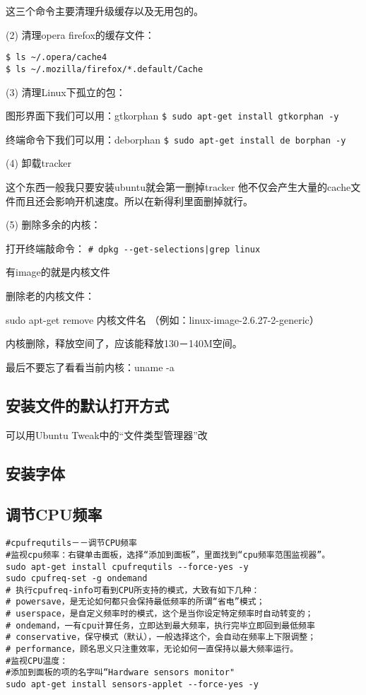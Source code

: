 这三个命令主要清理升级缓存以及无用包的。

(2) 清理opera firefox的缓存文件：
\begin{verbatim}
$ ls ~/.opera/cache4
$ ls ~/.mozilla/firefox/*.default/Cache
\end{verbatim}

(3) 清理Linux下孤立的包：

图形界面下我们可以用：gtkorphan
\verb"$ sudo apt-get install gtkorphan -y"

终端命令下我们可以用：deborphan
\verb"$ sudo apt-get install de borphan -y"

(4) 卸载tracker

这个东西一般我只要安装ubuntu就会第一删掉tracker 他不仅会产生大量的cache文件而且还会影响开机速度。所以在新得利里面删掉就行。

(5) 删除多余的内核：

打开终端敲命令：
\verb"# dpkg --get-selections|grep linux"

有image的就是内核文件

删除老的内核文件：

sudo apt-get remove 内核文件名 （例如：linux-image-2.6.27-2-generic）

内核删除，释放空间了，应该能释放130－140M空间。

最后不要忘了看看当前内核：uname -a

\subsection{安装文件的默认打开方式}
可以用Ubuntu Tweak中的“文件类型管理器”改

\subsection{安装字体}

\subsection{调节CPU频率}
\begin{verbatim}
#cpufrequtils－－调节CPU频率
#监视cpu频率：右键单击面板，选择“添加到面板”，里面找到“cpu频率范围监视器”。
sudo apt-get install cpufrequtils --force-yes -y
sudo cpufreq-set -g ondemand
# 执行cpufreq-info可看到CPU所支持的模式，大致有如下几种：
# powersave，是无论如何都只会保持最低频率的所谓“省电”模式；
# userspace，是自定义频率时的模式，这个是当你设定特定频率时自动转变的；
# ondemand，一有cpu计算任务，立即达到最大频率，执行完毕立即回到最低频率
# conservative，保守模式（默认），一般选择这个，会自动在频率上下限调整；
# performance，顾名思义只注重效率，无论如何一直保持以最大频率运行。 
#监视CPU温度：
#添加到面板的项的名字叫“Hardware sensors monitor"
sudo apt-get install sensors-applet --force-yes -y
\end{verbatim}

